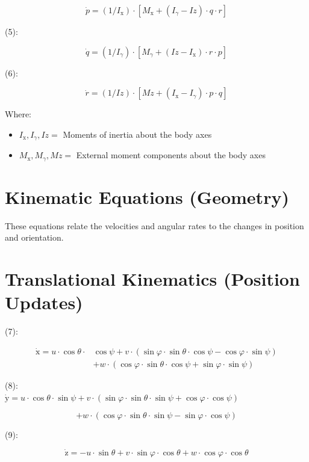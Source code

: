 \documentclass[10pt]{article}
\begin{document}
$$
\dot{p}=\left(1 / I_{\mathrm{x}}\right) \cdot\left[M_{\mathrm{x}}+\left(I_{\gamma}-I z\right) \cdot q \cdot r\right]
$$

(5):

$$
\dot{q}=\left(1 / I_{\gamma}\right) \cdot\left[M_{\gamma}+\left(I z-I_{\mathrm{x}}\right) \cdot r \cdot p\right]
$$

(6):

$$
\dot{r}=(1 / I z) \cdot\left[M z+\left(I_{\mathrm{x}}-I_{\gamma}\right) \cdot p \cdot q\right]
$$

Where:

\begin{itemize}
  \item $I_{\mathrm{x}}, I_{\gamma}, I z=$ Moments of inertia about the body axes
  \item $M_{\mathrm{x}}, M_{\gamma}, M z=$ External moment components about the body axes
\end{itemize}

\section*{Kinematic Equations (Geometry)}
These equations relate the velocities and angular rates to the changes in position and orientation.

\section*{Translational Kinematics (Position Updates)}
(7):

$$
\begin{aligned}
\dot{\mathrm{x}}=u \cdot \cos \theta \cdot & \cos \psi+v \cdot(\sin \varphi \cdot \sin \theta \cdot \cos \psi-\cos \varphi \cdot \sin \psi) \\
& +w \cdot(\cos \varphi \cdot \sin \theta \cdot \cos \psi+\sin \varphi \cdot \sin \psi)
\end{aligned}
$$

(8):\\
$\dot{\mathrm{y}}=u \cdot \cos \theta \cdot \sin \psi+v \cdot(\sin \varphi \cdot \sin \theta \cdot \sin \psi+\cos \varphi \cdot \cos \psi)$

$$
+w \cdot(\cos \varphi \cdot \sin \theta \cdot \sin \psi-\sin \varphi \cdot \cos \psi)
$$

(9):

$$
\dot{\mathrm{z}}=-u \cdot \sin \theta+v \cdot \sin \varphi \cdot \cos \theta+w \cdot \cos \varphi \cdot \cos \theta
$$
\end{document}
